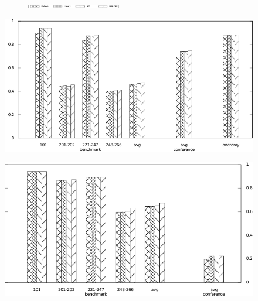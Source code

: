 \documentclass[twoside]{article}
\begin{document}
\begin{figure}[htb!]\centering
\begin{subfigure}{\textwidth}
	\centering
	\includegraphics[width=0.45\textwidth]{figures/legend.pdf}
\end{subfigure}
\begin{minipage}{0.49\textwidth}
	\centering
	\includegraphics[width=\textwidth]{data_figs/LogMap_F1-Measure.pdf}
	\label{fig:RiMOM_F1-Measure}
\end{minipage}
\begin{minipage}{0.49\textwidth}
	\centering
	\includegraphics[width=\textwidth]{data_figs/OLA_F1-Measure.pdf}
	\label{fig:XMap_F1-Measure}
\end{minipage}
\end{figure}
\end{document}
